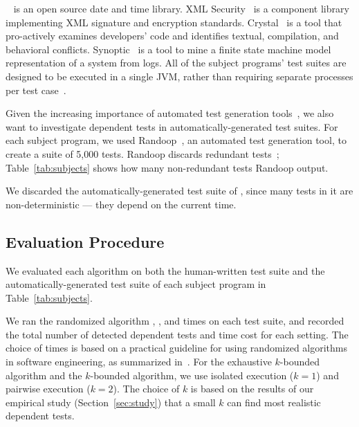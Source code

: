 \jt~\cite{jodatime} is an open source
date and time library.  XML Security~\cite{xmlsecurity}
is a component library implementing XML signature and encryption
standards. 
Crystal~\cite{Brun:2011:PDC, crystal} is a tool that
pro-actively examines developers' code and
identifies textual, compilation, and behavioral conflicts.
Synoptic~\cite{synoptic, Beschastnikh:2011:LEI} is a tool to mine a finite state
machine model representation of a system from logs.
All of the subject programs' test suites are designed to be executed in
a single JVM, rather than requiring separate processes per test case~\cite{vmvm}.

Given the increasing importance of automated test generation
tools~\cite{PachecoLET2007, ZhangSBE2011, Csallner:2004, fraseretal:ISSTA:2011},
we also want to investigate dependent tests in automatically-generated
test suites. For each subject program, we used
Randoop~\cite{PachecoLET2007}, an automated
test generation tool, to create a suite of 5,000 tests.
Randoop discards redundant tests~\cite[\S III.E]{RobinsonEPAL2011};
Table~\ref{tab:subjects} shows how many non-redundant
tests Randoop output.

We discarded the automatically-generated test suite of
\jt, since many tests in it are non-deterministic ---
they depend on the current time.


\subsection{Evaluation Procedure}

We evaluated each algorithm 
on both the human-written test suite 
and the automatically-generated test suite
of each subject program in Table~\ref{tab:subjects}.


We ran the randomized algorithm \smalltrialnum, \mediumtrialnum,
and \trialnum times on each test suite, and recorded
the total number of detected dependent tests and time cost
for each setting. The choice of \trialnum times is based
on a practical guideline for using randomized algorithms
in software engineering, as summarized in~\cite{Arcuri:2011}.
%
For the exhaustive $k$-bounded algorithm
and the \dependenceaware{} $k$-bounded algorithm,
we use isolated execution ($k = 1$) and
pairwise execution ($k = 2$). The choice of $k$ is
based on the results of our empirical
study (Section~\ref{sec:study}) that a small $k$
can find most realistic dependent tests.

